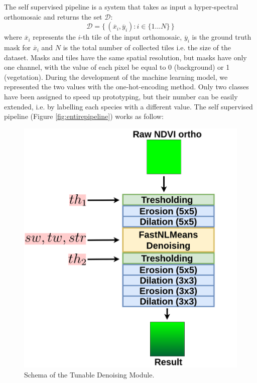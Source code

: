 \documentclass[comsoc,final]{IEEEtran}
\begin{document}
The self supervised pipeline is a system that takes as input a hyper-spectral orthomosaic and returns the set $\mathcal{D}$: \[
\mathcal{D} = \{\, (\overline{x}_i,\overline{y}_i):i \in \{1...N\}\,\}
\] where $\overline{x}_i$ represents the $i$-th tile of the input orthomosaic, $\overline{y}_i$ is the ground truth mask for $\overline{x}_i$ and $N$ is the total number of collected tiles i.e. the size of the dataset.
Masks and tiles have the same spatial resolution, but masks have only one channel, with the value of each pixel be equal to 0 (background) or 1 (vegetation). During the development of the machine learning model, we represented the two values with the one-hot-encoding method.
Only
two classes have been assigned to speed up prototyping, but their number can be easily extended, i.e. by labelling each species with a different value. The self supervised pipeline (Figure \ref{fig:entirepipeline}) works as follow:

\begin{figure}
    \centering
    \includegraphics[width=0.75\columnwidth]{tunable_module}
    \caption{Schema of the Tunable Denoising Module.}
    \label{fig:tunable_module}
\end{figure}%
\end{document}
